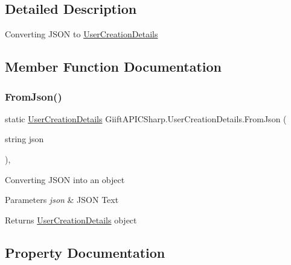 \subsection{Detailed Description}
Converting J\+S\+ON to \hyperlink{class_giift_a_p_i_c_sharp_1_1_user_creation_details}{User\+Creation\+Details} 



\subsection{Member Function Documentation}
\mbox{\label{class_giift_a_p_i_c_sharp_1_1_user_creation_details_abe2abcceb4d98d3839288d1013c77d65}} 
\subsubsection{\texorpdfstring{From\+Json()}{FromJson()}}
{\footnotesize\ttfamily static \hyperlink{class_giift_a_p_i_c_sharp_1_1_user_creation_details}{User\+Creation\+Details} Giift\+A\+P\+I\+C\+Sharp.\+User\+Creation\+Details.\+From\+Json (\begin{DoxyParamCaption}\item[{string}]{json }\end{DoxyParamCaption})\hspace{0.3cm}{\ttfamily [inline]}, {\ttfamily [static]}}



Converting J\+S\+ON into an object 


\begin{DoxyParams}{Parameters}
{\em json} & J\+S\+ON Text\\
\hline
\end{DoxyParams}
\begin{DoxyReturn}{Returns}
\hyperlink{class_giift_a_p_i_c_sharp_1_1_user_creation_details}{User\+Creation\+Details} object
\end{DoxyReturn}


\subsection{Property Documentation}
\mbox{\label{class_giift_a_p_i_c_sharp_1_1_user_creation_details_aaeb28df36f09bcd7ec302b0998b41ad7}} 
